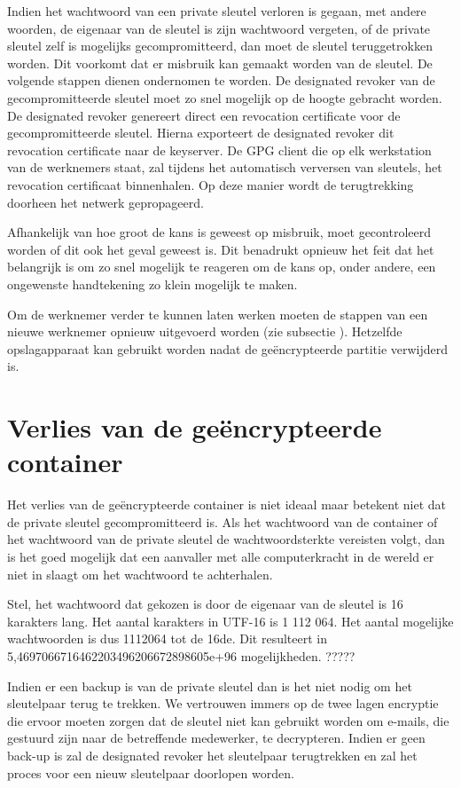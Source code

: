 Indien het wachtwoord van een private sleutel verloren is gegaan, met andere
woorden, de eigenaar van de sleutel is zijn wachtwoord vergeten, of de private
sleutel zelf is mogelijks gecompromitteerd, dan moet de sleutel teruggetrokken
worden. Dit voorkomt dat er misbruik kan gemaakt worden van de sleutel. De
volgende stappen dienen ondernomen te worden. De designated revoker van de
gecompromitteerde sleutel moet zo snel mogelijk op de hoogte gebracht worden. De
designated revoker genereert direct een revocation certificate voor de
gecompromitteerde sleutel. Hierna exporteert de designated revoker dit
revocation certificate naar de keyserver. De GPG client die op elk werkstation
van de werknemers staat, zal tijdens het automatisch verversen van sleutels, het
revocation certificaat binnenhalen. Op deze manier wordt de terugtrekking
doorheen het netwerk gepropageerd.

Afhankelijk van hoe groot de kans is geweest op misbruik, moet gecontroleerd
worden of dit ook het geval geweest is. Dit benadrukt opnieuw het feit dat het
belangrijk is om zo snel mogelijk te reageren om de kans op, onder andere, een
ongewenste handtekening zo klein mogelijk te maken.

Om de werknemer verder te kunnen laten werken moeten de stappen van een nieuwe
werknemer opnieuw uitgevoerd worden (zie subsectie
). Hetzelfde opslagapparaat kan
gebruikt worden nadat de geëncrypteerde partitie verwijderd is.

\section{Verlies van de geëncrypteerde container}
\label{sec:verlies-geencrypteerde-container}

Het verlies van de geëncrypteerde container is niet ideaal maar betekent niet
dat de private sleutel gecompromitteerd is. Als het wachtwoord van de container
of het wachtwoord van de private sleutel de wachtwoordsterkte vereisten volgt,
dan is het goed mogelijk dat een aanvaller met alle computerkracht in de wereld
er niet in slaagt om het wachtwoord te achterhalen.

Stel, het wachtwoord dat gekozen is door de eigenaar van de sleutel is 16
karakters lang. Het aantal karakters in UTF-16 is 1 112 064. Het aantal
mogelijke wachtwoorden is dus 1112064 tot de 16de. Dit resulteert in
5,4697066716462203496206672898605e+96 mogelijkheden. ?????

Indien er een backup is van de private sleutel dan is het niet nodig om het
sleutelpaar terug te trekken. We vertrouwen immers op de twee lagen encryptie
die ervoor moeten zorgen dat de sleutel niet kan gebruikt worden om e-mails, die
gestuurd zijn naar de betreffende medewerker, te decrypteren. Indien er geen
back-up is zal de designated revoker het sleutelpaar terugtrekken en zal het
proces voor een nieuw sleutelpaar doorlopen worden.
